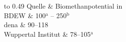 {
\renewcommand{\arraystretch}{1.1}
\begin{table}[H]
	\begin{center}
		\caption{Biomethanpotential in Deutschland}
		\label{tab:tab_methan-potential}
		\begin{tabu} to 0.49\textwidth {X X[1.2, r]}
			\hline
			Quelle             &	Biomethanpotential in \si{\twh}																\\ \hline
			BDEW               	& 	\SI{100}{\relax}$^{\mathrm{a}}$ {--} \SI{250}{\relax}$^{\mathrm{b}}$	\\
			dena               		& 	\SIrange{90}{118}{\relax}											\\
			Wuppertal Institut 	& 	\SIrange{78}{105}{\relax}$^{\mathrm{a}}$							\\ \hline
			 														\\
		\end{tabu}
	\end{center}
\end{table}
}